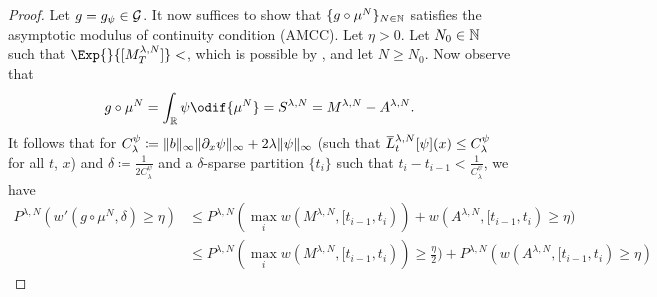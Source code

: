 \begin{proof}
  Let \(g = g_\psi \in \mathcal{G}\).
  It now suffices to show that \(\{g \circ \mu^N\}_{N\in\mathbb{N}}\) satisfies the asymptotic modulus of continuity condition (AMCC).
  Let \(\eta > 0\).
  Let \(N_0 \in \mathbb{N}\) such that \(\Exp{}{[M_T^{\lambda, N}]} < \), which is possible by , and let \(N \geq N_0\).
  Now observe that
  \begin{equation}
    g \circ \mu^N = \int_\potspace \psi \odif{\mu^N} = S^{\lambda, N} = M^{\lambda, N} - A^{\lambda, N}.
  \end{equation}
  It follows that for \(C_\lambda^\psi \coloneqq \lVert b\rVert_\infty \lVert\partial_x \psi\rVert_\infty + 2\lambda \lVert\psi\rVert_\infty\) (such that \(\ol{L}^{\lambda,N}_t [\psi] (x) \leq C_\lambda^\psi\) for all \(t\), \(x\)) and \(\delta \coloneqq \frac{1}{2C_\lambda^\psi}\) and a \( \delta \)-sparse partition \(\{t_i\}\) such that \(t_i - t_{i-1} < \frac{1}{C_\lambda^\psi}\), we have
  \begin{equation}
    \begin{split}
      P^{\lambda, N} (w'(g \circ \mu^N, \delta) \geq \eta)
       & \leq P^{\lambda, N}( \max_i w(M^{\lambda, N}, [t_{i-1}, t_i)) + w(A^{\lambda, N}, [t_{i-1}, t_i) \geq \eta)                                     \\
       & \leq P^{\lambda, N}( \max_i w(M^{\lambda, N}, [t_{i-1}, t_i)) \geq \frac{\eta}{2}) + P^{\lambda, N}(w(A^{\lambda, N}, [t_{i-1}, t_i) \geq \eta)
    \end{split}
  \end{equation}


\end{proof}